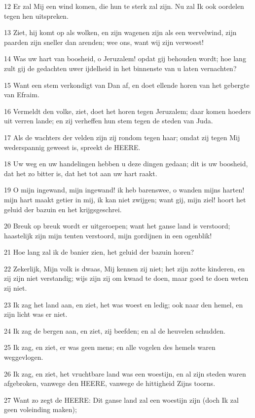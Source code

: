 \par 12 Er zal Mij een wind komen, die hun te sterk zal zijn. Nu zal Ik ook oordelen tegen hen uitspreken.
\par 13 Ziet, hij komt op als wolken, en zijn wagenen zijn als een wervelwind, zijn paarden zijn sneller dan arenden; wee ons, want wij zijn verwoest!
\par 14 Was uw hart van boosheid, o Jeruzalem! opdat gij behouden wordt; hoe lang zult gij de gedachten uwer ijdelheid in het binnenste van u laten vernachten?
\par 15 Want een stem verkondigt van Dan af, en doet ellende horen van het gebergte van Efraim.
\par 16 Vermeldt den volke, ziet, doet het horen tegen Jeruzalem; daar komen hoeders uit verren lande; en zij verheffen hun stem tegen de steden van Juda.
\par 17 Als de wachters der velden zijn zij rondom tegen haar; omdat zij tegen Mij wederspannig geweest is, spreekt de HEERE.
\par 18 Uw weg en uw handelingen hebben u deze dingen gedaan; dit is uw boosheid, dat het zo bitter is, dat het tot aan uw hart raakt.
\par 19 O mijn ingewand, mijn ingewand! ik heb barenswee, o wanden mijns harten! mijn hart maakt getier in mij, ik kan niet zwijgen; want gij, mijn ziel! hoort het geluid der bazuin en het krijgsgeschrei.
\par 20 Breuk op breuk wordt er uitgeroepen; want het ganse land is verstoord; haastelijk zijn mijn tenten verstoord, mijn gordijnen in een ogenblik!
\par 21 Hoe lang zal ik de banier zien, het geluid der bazuin horen?
\par 22 Zekerlijk, Mijn volk is dwaas, Mij kennen zij niet; het zijn zotte kinderen, en zij zijn niet verstandig; wijs zijn zij om kwaad te doen, maar goed te doen weten zij niet.
\par 23 Ik zag het land aan, en ziet, het was woest en ledig; ook naar den hemel, en zijn licht was er niet.
\par 24 Ik zag de bergen aan, en ziet, zij beefden; en al de heuvelen schudden.
\par 25 Ik zag, en ziet, er was geen mens; en alle vogelen des hemels waren weggevlogen.
\par 26 Ik zag, en ziet, het vruchtbare land was een woestijn, en al zijn steden waren afgebroken, vanwege den HEERE, vanwege de hittigheid Zijns toorns.
\par 27 Want zo zegt de HEERE: Dit ganse land zal een woestijn zijn (doch Ik zal geen voleinding maken);
